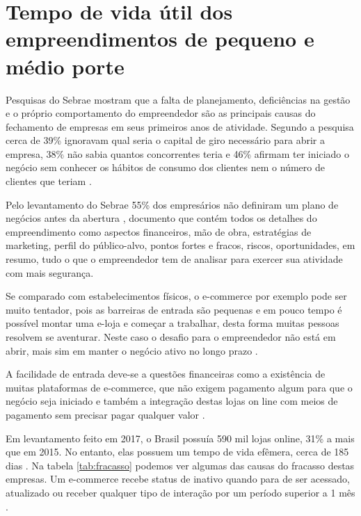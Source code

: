 \section{Tempo de vida útil dos empreendimentos de pequeno e médio porte}
\label{sec:vidautil}

Pesquisas do Sebrae mostram que a falta de planejamento, deficiências na gestão e o próprio comportamento do empreendedor são as principais causas do fechamento de empresas em seus primeiros anos de atividade. Segundo a pesquisa cerca de 39\% ignoravam qual seria o capital de giro necessário para abrir a empresa, 38\% não sabia quantos concorrentes teria e 46\% afirmam ter iniciado o negócio sem conhecer os hábitos de consumo dos clientes nem o número de clientes que teriam \cite{sebraesp}.  

Pelo levantamento do Sebrae 55\% dos empresários não definiram um plano de negócios antes da abertura \cite{sebraesp}, documento que contém todos os detalhes do empreendimento como aspectos financeiros, mão de obra, estratégias de marketing, perfil do público-alvo, pontos fortes e fracos, riscos, oportunidades, em resumo, tudo o que o empreendedor tem de analisar para exercer sua atividade com mais segurança.

Se comparado com estabelecimentos físicos, o e-commerce por exemplo pode ser muito tentador, pois as barreiras de entrada são pequenas e em pouco tempo é possível montar uma e-loja e começar a trabalhar, desta forma muitas pessoas resolvem se aventurar. Neste caso o desafio para o empreendedor não está em abrir, mais sim em manter o negócio ativo no longo prazo \cite{ecomnews}. 

A facilidade de entrada deve-se a questões financeiras como a existência de muitas plataformas de e-commerce, que não exigem pagamento algum para que o negócio seja iniciado e também a integração destas lojas on line com meios de pagamento sem precisar pagar qualquer valor \cite{newtrade2017}.
 
Em levantamento feito em 2017, o Brasil possuía 590 mil lojas online, 31\% a mais que em 2015. No entanto, elas possuem um tempo de vida efêmera, cerca de 185 dias \cite{sbvcsociedadebrasileiradevarejoeconsumo2017}. Na tabela \ref{tab:fracasso} podemos ver algumas das causas do fracasso destas empresas. Um e-commerce recebe status de inativo quando para de ser acessado, atualizado ou receber qualquer tipo de interação por um período superior a 1 mês \cite{ecomnews}. 

